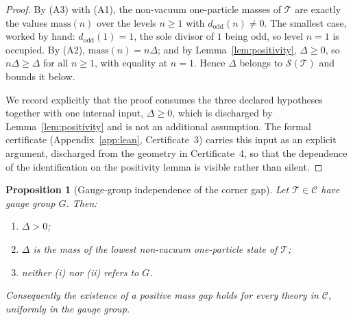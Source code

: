 \documentclass[11pt,a4paper]{article}
\newcommand{\dodd}{d_{\mathrm{odd}}}
\newcommand{\class}{\mathcal{C}}
\newcommand{\thy}{\mathcal{T}}
\theoremstyle{plain}
\newtheorem{proposition}[theorem]{Proposition}
\theoremstyle{definition}
\theoremstyle{remark}
\begin{document}
\begin{proof}
By (A3) with (A1), the non-vacuum one-particle masses of $\thy$ are exactly the values $\mathrm{mass}(n)$ over the levels $n \ge 1$ with $\dodd(n) \ne 0$. The smallest case, worked by hand: $\dodd(1) = 1$, the sole divisor of $1$ being odd, so level $n = 1$ is occupied. By (A2), $\mathrm{mass}(n) = n\Delta$; and by Lemma~\ref{lem:positivity}, $\Delta \ge 0$, so $n\Delta \ge \Delta$ for all $n \ge 1$, with equality at $n = 1$. Hence $\Delta$ belongs to $\mathcal{S}(\thy)$ and bounds it below.

We record explicitly that the proof consumes the three declared hypotheses together with one internal input, $\Delta \ge 0$, which is discharged by Lemma~\ref{lem:positivity} and is not an additional assumption. The formal certificate (Appendix~\ref{app:lean}, Certificate~3) carries this input as an explicit argument, discharged from the geometry in Certificate~4, so that the dependence of the identification on the positivity lemma is visible rather than silent.
\end{proof}

\begin{proposition}[Gauge-group independence of the corner
gap]\label{prop:transfer} Let $\thy \in \class$ have gauge group $G$. Then:
\begin{enumerate}[label=\textup{(\roman*)}]
\item $\Delta > 0$;
\item $\Delta$ is the mass of the lowest non-vacuum one-particle
state of $\thy$;
\item neither \textup{(i)} nor \textup{(ii)} refers to $G$.
\end{enumerate}
Consequently the existence of a positive mass gap holds for every theory in $\class$, uniformly in the gauge group.
\end{proposition}
\end{document}
